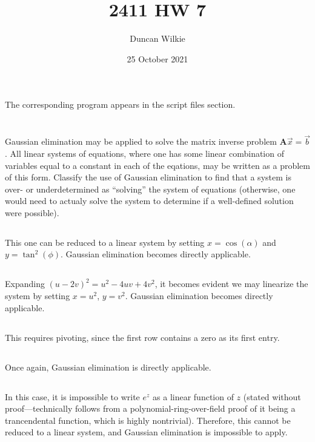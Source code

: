 \documentclass{article}
\title{2411 HW 7}
\author{Duncan Wilkie}
\date{25 October 2021}
\begin{document}
\section{}
The corresponding program appears in the script files section.

\section{}
Gaussian elimination may be applied to solve the matrix inverse problem $\mathbf{A}\vec{x}=\vec{b}$. All linear systems of equations, where one has some linear combination of variables equal to a constant in each of the eqations, may be written as a problem of this form. Classify the use of Gaussian elimination to find that a system is over- or underdetermined as ``solving'' the system of equations (otherwise, one would need to actualy solve the system to determine if a well-defined solution were possible).
\subsection{}
This one can be reduced to a linear system by setting $x = \cos(\alpha)$ and $y = \tan^2(\phi)$. Gaussian elimination becomes directly applicable.
\subsection{}
Expanding $(u-2v)^2=u^2-4uv+4v^2$, it becomes evident we may linearize the system by setting $x = u^2$, $y=v^2$. Gaussian elimination becomes directly applicable.
\subsection{}
This requires pivoting, since the first row contains a zero as its first entry. 
\subsection{}
Once again, Gaussian elimination is directly applicable.
\subsection{}
In this case, it is impossible to write $e^z$ as a linear function of $z$ (stated without proof---technically follows from a polynomial-ring-over-field proof of it being a trancendental function, which is highly nontrivial). Therefore, this cannot be reduced to a linear system, and Gaussian elimination is impossible to apply.
\end{document}
